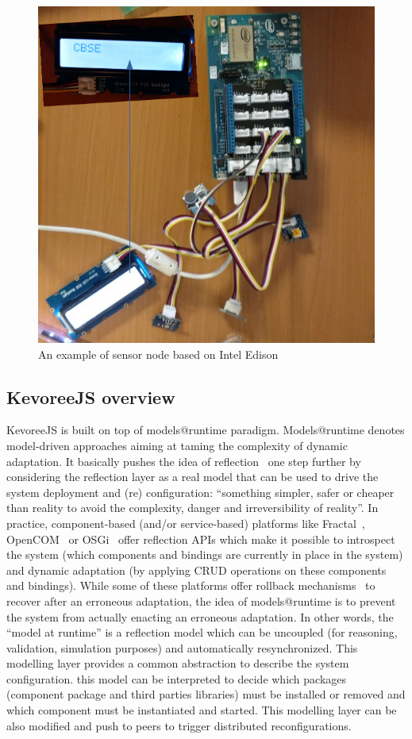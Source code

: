 \begin{figure}[h]
	\centering
	\includegraphics[width=0.8\linewidth]{figures/fig4}
	\caption{An example of sensor node based on Intel Edison}
	\label{fig:fig2}
\end{figure}


\subsection{KevoreeJS overview }
KevoreeJS is built on top of models@runtime paradigm. Models@runtime denotes model-driven approaches aiming at taming the complexity of dynamic adaptation. It basically pushes the idea of reflection~\cite{DBLP:conf/icse/MorinBNJ09} one step further by considering the reflection layer as a real model that can be used to drive the system deployment and (re) configuration: ``something simpler, safer or cheaper than reality to avoid the complexity, danger and irreversibility of reality''. In practice, component-based (and/or service-based) platforms like Fractal~\cite{bruneton2006fractal}, OpenCOM~\cite{} or OSGi~\cite{hall2011osgi} offer reflection APIs which make it possible to introspect the system (which components and bindings are currently in place in the system) and dynamic adaptation (by applying CRUD operations on these components and bindings). While some of these platforms offer rollback mechanisms~\cite{} to recover after an erroneous adaptation, the idea of models@runtime is to prevent the system from actually enacting an erroneous adaptation. In other words, the ``model at runtime'' is a reflection model which can be uncoupled (for reasoning, validation, simulation purposes) and automatically resynchronized. This modelling layer provides a common abstraction to describe the system configuration. this model can be interpreted to decide which packages (component package and third parties libraries) must be installed or removed and which component must be instantiated and started. This modelling layer can be also modified and push to peers to trigger distributed reconfigurations. 

